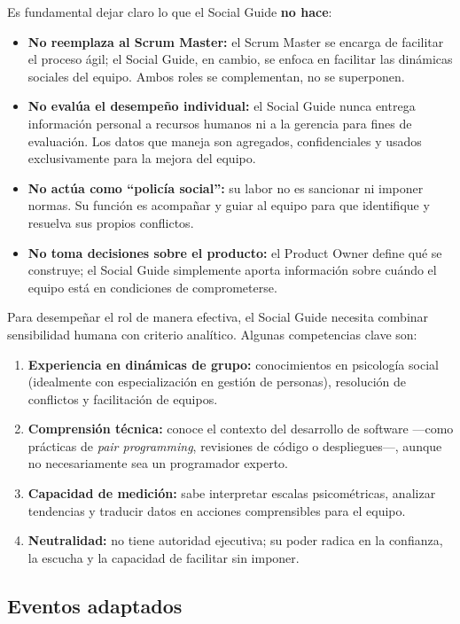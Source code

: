 Es fundamental dejar claro lo que el Social Guide \textbf{no hace}:

\begin{itemize}
    \item \textbf{No reemplaza al Scrum Master:} el Scrum Master se encarga de facilitar el proceso ágil; el Social Guide, en cambio, se enfoca en facilitar las dinámicas sociales del equipo. Ambos roles se complementan, no se superponen.
    \item \textbf{No evalúa el desempeño individual:} el Social Guide nunca entrega información personal a recursos humanos ni a la gerencia para fines de evaluación. Los datos que maneja son agregados, confidenciales y usados exclusivamente para la mejora del equipo.
    \item \textbf{No actúa como ``policía social'':} su labor no es sancionar ni imponer normas. Su función es acompañar y guiar al equipo para que identifique y resuelva sus propios conflictos.
    \item \textbf{No toma decisiones sobre el producto:} el Product Owner define qué se construye; el Social Guide simplemente aporta información sobre cuándo el equipo está en condiciones de comprometerse.
\end{itemize}

Para desempeñar el rol de manera efectiva, el Social Guide necesita combinar sensibilidad humana con criterio analítico. Algunas competencias clave son:

\begin{enumerate}
    \item \textbf{Experiencia en dinámicas de grupo:} conocimientos en psicología social (idealmente con especialización en gestión de personas), resolución de conflictos y facilitación de equipos.
    \item \textbf{Comprensión técnica:} conoce el contexto del desarrollo de software —como prácticas de \textit{pair programming}, revisiones de código o despliegues—, aunque no necesariamente sea un programador experto.
    \item \textbf{Capacidad de medición:} sabe interpretar escalas psicométricas, analizar tendencias y traducir datos en acciones comprensibles para el equipo.
    \item \textbf{Neutralidad:} no tiene autoridad ejecutiva; su poder radica en la confianza, la escucha y la capacidad de facilitar sin imponer.
\end{enumerate}

\subsection{Eventos adaptados}

